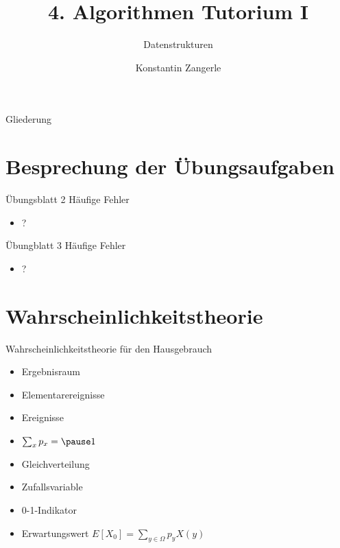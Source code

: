 \documentclass[18pt]{beamer}
\title[Algo I Tut]{4. Algorithmen Tutorium I}
\subtitle{Datenstrukturen}
\author[Zangerle]{Konstantin Zangerle}
\institute{Institut für Theoretische Informatik}
\begin{document}

\begin{frame}
\titlepage
\end{frame}

\begin{frame}{Gliederung}
 \tableofcontents
\end{frame}


\section{Besprechung der Übungsaufgaben}
\begin{frame}{Übungsblatt 2}
Häufige Fehler
\begin{itemize}
 \item ?
\end{itemize}

\end{frame}

\begin{frame}{Übungblatt 3}
Häufige Fehler
\begin{itemize}
 \item ?
\end{itemize}

\end{frame}

\section{Wahrscheinlichkeitstheorie}
\begin{frame}{Wahrscheinlichkeitstheorie für den Hausgebrauch}
 \begin{itemize}
  \item Ergebnisraum
  \item Elementarereignisse
  \item Ereignisse
  \item $\sum_x p_x = \pause 1$
  \item Gleichverteilung
  \item Zufallsvariable
  \item 0-1-Indikator
  \item Erwartungswert \pause $E[X_0] = \sum_{y \in \Omega} p_y X(y)$
 \end{itemize}

\end{frame}
\end{document}
